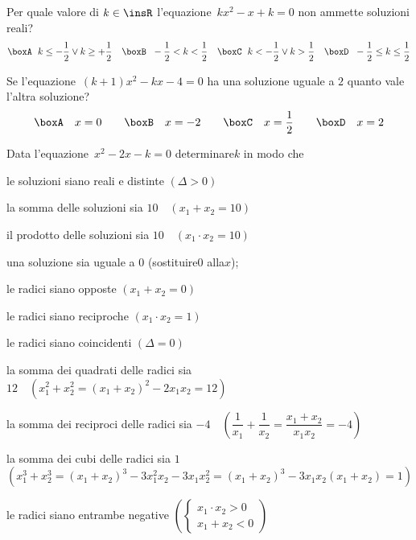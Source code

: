 \begin{esercizio}
 \label{ese:3.105}
 Per quale valore di $k \in \insR$ l'equazione~$kx^{2}-x + k = 0$ non 
ammette soluzioni reali?
\[\boxA\;~ k \leq-\dfrac{1}{2} \vee k \geq + \dfrac{1}{2}\quad\boxB\;~ - 
\dfrac{1}{2} 
< k < \dfrac{1}{2}\quad\boxC\;~ k <-\dfrac{1}{2} \vee k > 
\dfrac{1}{2}\quad\boxD\;~ - 
\dfrac{1}{2} \leq k \leq \dfrac{1}{2}\]
\end{esercizio}

\begin{esercizio}
 \label{ese:3.111}
Se l'equazione~$(k + 1) x^{2}-kx-4 = 0$ ha una soluzione uguale a $2$ 
quanto 
vale l'altra soluzione?
\[\boxA\quad x = 0\qquad\boxB\quad x =-2\qquad\boxC\quad x = 
\dfrac{1}{2}\qquad\boxD\quad x = 2\]
\end{esercizio}

\begin{esercizio}[\Ast]
 \label{ese:3.97}
Data l'equazione~$x^{2}-2 x-k = 0$ determinare$k$ in modo che
\begin{enumeratea}
\item le soluzioni siano reali e distinte \quad$(\Delta>0)$
\item la somma delle soluzioni sia $10 \quad (x_{1} + x_{2} = 10)$
\item il prodotto delle soluzioni sia $10 \quad (x_{1} \cdot x_{2} = 10)$
\item una soluzione sia uguale a $0$ \quad (sostituire$0$ alla$x$);~
\item le radici siano opposte \quad $(x_{1} + x_{2} = 0)$
\item le radici siano reciproche \quad $(x_{1} \cdot x_{2} = 1)$
\item le radici siano coincidenti \quad $(\Delta=0)$
\item la somma dei quadrati delle radici sia $12 \quad \left(x_{1}^{2} + 
x_{2}^{2} = (x_{1} + x_{2})^{2}-2x_{1} x_{2} = 12\right)$
\item la somma dei reciproci delle radici sia $-4 \quad 
\left(\dfrac{1}{x_{1}} + 
\dfrac{1}{x_{2}} = \dfrac{x_{1} +x_{2}}{x_{1} x_{2}} =-4 \right)$
\item la somma dei cubi delle radici sia $1$ \protect\\$\left( x_{1}^{3} + 
x_{2}^{3} = (x_{1} + x_{2})^{3}-3x_{1}^{2} x_{2}-3x_{1} x_{2}^{2} = (x_{1} 
+ 
x_{2})^{3}-3x_{1} x_{2} (x_{1} + x_{2}) = 1\right)$
\item le radici siano entrambe negative $\left(\left\{\begin{array}{l} 
x_{1} 
\cdot x_{2} > 0 \\x_{1} + x_{2} < 0 \end{array}\right.\right)$
\end{enumeratea}
\end{esercizio}

